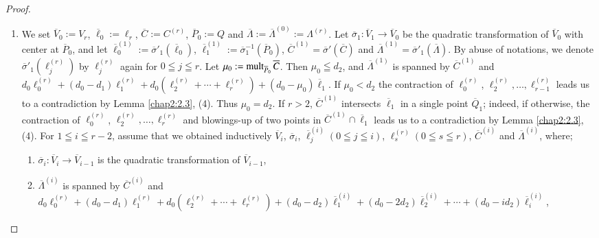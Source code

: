 \begin{proof}
\begin{enumerate}
\item We set $\overline{V}_{0}:=V_{r}$,
  $\overline{\ell}_{0}:=\ell_{r}$, $\overline{C}:=C^{(r)}$,
  $\overline{P}_{0}:=Q$ and
  $\overline{\Lambda}:=\overline{\Lambda}^{(0)}:=\Lambda^{(r)}$. Let
  $\overline{\sigma}_{1}:\overline{V}_{1}\to \overline{V}_{0}$ be the
  quadratic transformation of $\overline{V}_{0}$ with center at
  $\overline{P}_{0}$, and let
  $\overline{\ell}^{(1)}_{0}:=\overline{\sigma}'_{1}(\overline{\ell}_{0})$,
  $\overline{\ell}_{1}^{(1)}:=\overline{\sigma}^{-1}_{1}(\overline{P}_{0})$,
  $\overline{C}^{(1)}=\overline{\sigma}'(\overline{C})$ and
  $\overline{\Lambda}^{(1)}=\overline{\sigma}'_{1}(\overline{\Lambda})$. By
  abuse of notations, we denote
  $\overline{\sigma}'_{1}(\ell_{j}^{(r)})$ by $\ell^{(r)}_{j}$ again
  for $0\leqq j\leqq r$. Let
  $\mu_{0}:=\operatorname{mult}_{\overline{P}_{0}}\overline{C}$. Then $\mu_{0}\leqq
  d_{2}$, and $\overline{\Lambda}^{(1)}$ is spanned by
  $\overline{C}^{(1)}$ and
  $d_{0}\ell_{0}^{(r)}+(d_{0}-d_{1})\ell_{1}^{(r)}+d_{0}(\ell^{(r)}_{2}+\cdots+\ell^{(r)}_{r})+(d_{0}-\mu_{0})\overline{\ell}_{1}$. If
  $\mu_{0}<d_{2}$ the contraction of $\ell^{(r)}_{0}$,
  $\ell^{(r)}_{2},\ldots,\ell^{(r)}_{r-1}$ leads us to a contradiction
  by Lemma \ref{chap2:2.3}, (4). Thus $\mu_{0}=d_{2}$. If $r>2$,
  $\overline{C}^{(1)}$ intersects $\overline{\ell}_{1}$ in a single
  point $\overline{Q}_{1}$; indeed, if otherwise, the contraction of
  $\ell^{(r)}_{0}$, $\ell^{(r)}_{2},\ldots,\ell^{(r)}_{r}$ and
  blowings-up of two points in $\overline{C}^{(1)}\cap
  \overline{\ell}_{1}$ leads us to a contradiction by Lemma
  \ref{chap2:2.3}, (4). For $1\leqq i\leqq r-2$, assume that we obtained
  inductively $\overline{V}_{i}$, $\overline{\sigma}_{i}$,
  $\overline{\ell}^{(i)}_{j}(0\leqq j\leqq i)$, $\ell^{(r)}_{s}(0\leqq
  s\leqq r)$, $\overline{C}^{(i)}$ and $\overline{\Lambda}^{(i)}$,
  where;
\begin{enumerate}
\renewcommand{\theenumii}{\arabic{enumii}}
\renewcommand{\labelenumii}{(\theenumii)}
\item $\overline{\sigma}_{i}:\overline{V}_{i}\to \overline{V}_{i-1}$
  is the quadratic transformation of $\overline{V}_{i-1}$,

\item $\overline{\Lambda}^{(i)}$ is spanned by $\overline{C}^{(i)}$
  and
  $d_{0}\ell^{(r)}_{0}+(d_{0}-d_{1})\ell^{(r)}_{1}+d_{0}(\ell^{(r)}_{2}+\cdots+\ell^{(r)}_{r})+(d_{0}-d_{2})\overline{\ell}^{(i)}_{1}+(d_{0}-2d_{2})\overline{\ell}^{(i)}_{2}+\cdots+(d_{0}-id_{2})\overline{\ell}^{(i)}_{i}$,


\end{enumerate}
\end{enumerate}
\end{proof}
